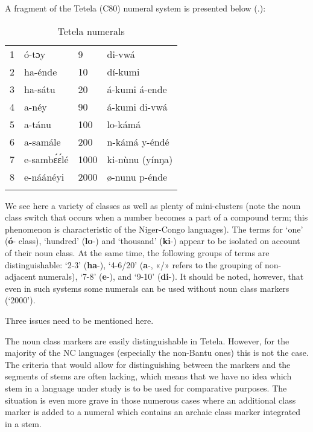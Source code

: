 A fragment of the Tetela (C80) numeral system is presented below (.):


\begin{table}
\caption{Tetela numerals}
\label{tab:1:1}

\begin{tabularx}{\textwidth}{lXXX}
\lsptoprule

1 & {\'{o}}-tɔy & 9 & di-vw{\'{a}}\\
2 & ha-{\'{e}}nde & 10 & d{\'{i}}-kumi\\
3 & ha-s{\'{a}}tu & 20 & {\'{a}}-kumi {\'{a}}-ende\\
4 & a-n{\'{e}}y & 90 & {\'{a}}-kumi di-vw{\'{a}}\\
5 & a-t{\'{a}}nu & 100 & lo-k{\'{a}}m{\'{a}}\\
6 & a-sam{\'{a}}le & 200 & n-k{\'{a}}m{\'{a}} y-{\'{e}}nd{\'{e}}\\
7 & e-samb{\'{ɛ}}{\'{ɛ}}l{\'{e}} & 1000 & ki-n{\`{u}}nu (y{\'{i}}nŋa)\\
8 & e-n{\'{a}}{\'{a}}n{\'{e}}yi & 2000 & ø-nunu p-{\'{e}}nde\\
\lspbottomrule
\end{tabularx}
\end{table}

We see here a variety of classes as well as plenty of mini-clusters (note the noun class switch that occurs when a number becomes a part of a compound term; this phenomenon is characteristic of the Niger-Congo languages). The terms for ‘one’ (\textbf{{\'{o}}}- class), ‘hundred’ (\textbf{lo}-) and ‘thousand’ (\textbf{ki}-) appear to be isolated on account of their noun class. At the same time, the following groups of terms are distinguishable: ‘2-3’ (\textbf{ha}-), ‘4-6/20’ (\textbf{a}-, «/» refers to the grouping of non-adjacent numerals), ‘7-8’ (\textbf{e}-), and ‘9-10’ (\textbf{di}-).  It should be noted, however, that even in such systems some numerals can be used without noun class markers (‘2000’). 

Three issues need to be mentioned here.

The noun class markers are easily distinguishable in Tetela. However, for the majority of the NC languages (especially the non-Bantu ones) this is not the case. The criteria that would allow for distinguishing between the markers and the segments of stems are often lacking, which means that we have no idea which stem in a language under study is to be used for comparative purposes. The situation is even more grave in those numerous cases where an additional class marker is added to a numeral which contains an archaic class marker integrated in a stem.

